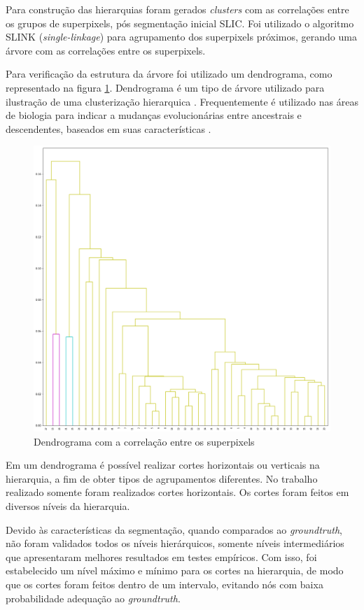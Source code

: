 \begin{document}
Para construção das hierarquias foram gerados \textit{clusters} com as correlações entre os grupos de superpixels, pós segmentação inicial SLIC. Foi utilizado o algoritmo SLINK (\textit{single-linkage}) para agrupamento dos superpixels próximos, gerando uma árvore com as correlações entre os superpixels.

Para verificação da estrutura da árvore foi utilizado um dendrograma, como representado na figura \ref{fig:DENDROGRAM}. Dendrograma é um tipo de árvore utilizado para ilustração de uma clusterização hierarquica \cite{WIKI_DENDROGRAM}. Frequentemente é utilizado nas áreas de biologia para indicar a mudanças evolucionárias entre ancestrais e descendentes, baseados em suas características \cite{DENDROGRAM}.

\begin{figure}[ht]
\centering
\includegraphics[width=1.\textwidth]{dendrogram.png}
\caption{Dendrograma com a correlação entre os superpixels}
\label{fig:DENDROGRAM}
\end{figure}

Em um dendrograma é possível realizar cortes horizontais ou verticais na hierarquia, a fim de obter tipos de agrupamentos diferentes. No trabalho realizado somente foram realizados cortes horizontais. Os cortes foram feitos em diversos níveis da hierarquia. 

Devido às características da segmentação, quando comparados ao \textit{groundtruth}, não foram validados todos os níveis hierárquicos, somente níveis intermediários que apresentaram melhores resultados em testes empíricos. Com isso, foi estabelecido um nível máximo e mínimo para os cortes na hierarquia, de modo que os cortes foram feitos dentro de um intervalo, evitando nós com baixa probabilidade adequação ao \textit{groundtruth}.
\end{document}
